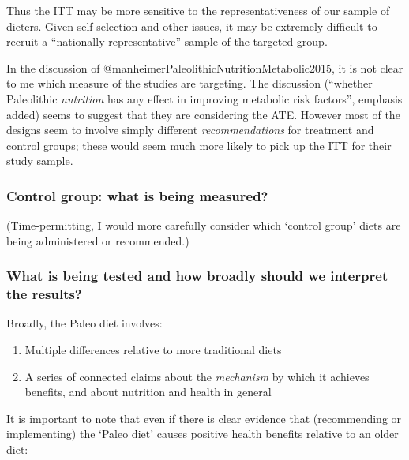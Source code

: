\documentclass[]{article}
\begin{document}
Thus the ITT may be more sensitive to the representativeness of our
sample of dieters. Given self selection and other issues, it may be
extremely difficult to recruit a ``nationally representative'' sample of
the targeted group.

In the discussion of @manheimerPaleolithicNutritionMetabolic2015, it is
not clear to me which measure of the studies are targeting. The
discussion (``whether Paleolithic \emph{nutrition} has any effect in
improving metabolic risk factors'', emphasis added) seems to suggest
that they are considering the ATE. However most of the designs seem to
involve simply different \emph{recommendations} for treatment and
control groups; these would seem much more likely to pick up the ITT for
their study sample.

\hypertarget{control-group-what-is-being-measured}{%
\subsubsection{Control group: what is being
measured?}\label{control-group-what-is-being-measured}}

(Time-permitting, I would more carefully consider which `control group'
diets are being administered or recommended.)

\hfill\break

\hypertarget{what-is-being-tested-and-how-broadly-should-we-interpret-the-results}{%
\subsubsection{What is being tested and how broadly should we interpret
the
results?}\label{what-is-being-tested-and-how-broadly-should-we-interpret-the-results}}

Broadly, the Paleo diet involves:

\begin{enumerate}
\def\labelenumi{\arabic{enumi}.}
\item
  Multiple differences relative to more traditional diets
\item
  A series of connected claims about the \emph{mechanism} by which it
  achieves benefits, and about nutrition and health in general
\end{enumerate}

\hfill\break

It is important to note that even if there is clear evidence that
(recommending or implementing) the `Paleo diet' causes positive health
benefits relative to an older diet:
\end{document}

